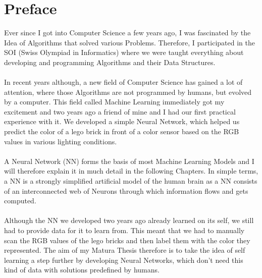 \documentclass[11pt, a4paper]{report}
\begin{document}
        \section{Preface}
    Ever since I got into Computer Science a few years ago, I was fascinated by the Idea of Algorithms that solved various Problems.
    Therefore, I participated in the SOI (Swiss Olympiad in Informatics) where we were taught everything about developing and programming Algorithms and their Data Structures.
    \\ \\ In recent years although, a new field of Computer Science has gained a lot of attention, where those Algorithms are not programmed by humans, but evolved by a computer.
    This field called Machine Learning immediately got my excitement and two years ago a friend of mine and I had our first practical experience with it.
    We developed a simple Neural Network, which helped us predict the color of a lego brick in front of a color sensor based on the RGB values in various lighting conditions.
    \\ \\ A Neural Network (NN) forms the basis of most Machine Learning Models and I will therefore explain it in much detail in the following Chapters.
    In simple terms, a NN is a strongly simplified artificial model of the human brain as a NN consists of an interconnected web of Neurons through which information flows and gets computed.
    \\ \\ Although the NN we developed two years ago already learned on its self, we still had to provide data for it to learn from.
    This meant that we had to manually scan the RGB values of the lego bricks and then label them with the color they represented.
    The aim of my Matura Thesis therefore is to take the idea of self learning a step further by developing Neural Networks, which don't need this kind of data with solutions predefined by humans.
\end{document}
